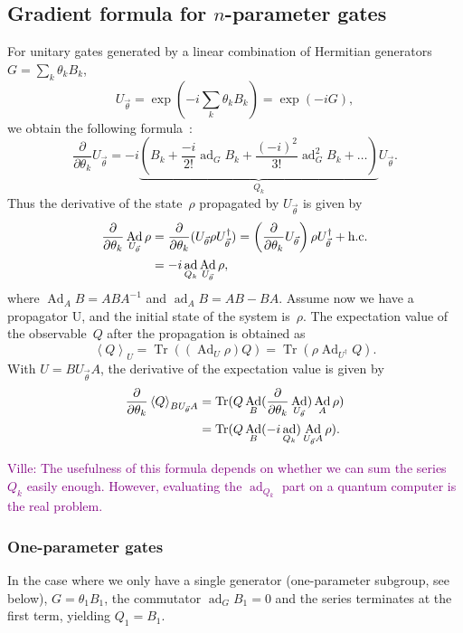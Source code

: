 \documentclass[aps,pra,10pt,twocolumn,groupedaddress,nofootinbib]{revtex4-1}
\theoremstyle{plain}
\DeclareMathOperator{\tr}{Tr}
\DeclareMathOperator{\Ad}{Ad}
\DeclareMathOperator{\ad}{ad}
\newcommand{\pd}[2]{\frac{\partial #1}{\partial #2}}  %
\newcommand{\be}{\begin{equation}}
\newcommand{\ee}{\end{equation}}
\newcommand{\expect}[1]{\ensuremath{\left\langle #1 \right\rangle}} %
\newcommand{\ville}[1]{\textcolor{purple}{Ville: #1}}
\begin{document}
\subsection{Gradient formula for $n$-parameter gates}
\label{sec:gradient_formula_for_n_parameter_gates}
For unitary gates generated by a linear combination of Hermitian generators
$G = \sum_k \theta_k B_k$,
\be
U_{\vec{\theta}} = \exp(-i \sum_k \theta_k B_k) = \exp(-i G),
\ee
we obtain the following formula~\cite{dynamo_manual}:
\be
\pd{}{\theta_k} U_{\vec{\theta}}
= -i \underbrace{\left(B_k +\frac{-i}{2!}\ad_G B_k +\frac{(-i)^2}{3!}\ad_G^2 B_k +\ldots \right)}_{Q_k}
U_{\vec{\theta}}.
\ee
Thus the derivative of the state~$\rho$ propagated by $U_{\vec{\theta}}$ is given by
\begin{align}
  \notag
  \pd{}{\theta_k} \Ad_{U_{\vec{\theta}}} \rho
  &= \pd{}{\theta_k} (U_{\vec{\theta}} \rho U_{\vec{\theta}}^\dagger)
  = \left(\pd{}{\theta_k} U_{\vec{\theta}}\right) \rho U_{\vec{\theta}}^\dagger +\text{h.c.}\\
  &= -i \ad_{Q_k} \Ad_{U_{\vec{\theta}}} \rho,
\end{align}
where $\Ad_{A} B = A B A^{-1}$ and $\ad_{A} B = A B - B A$.
Assume now we have a propagator U, and the initial state of the system is~$\rho$.
The expectation value of the observable~$Q$ after the propagation is obtained as
\be
\label{eq:Q_ev}
\expect{Q}_U = \tr((\Ad_{U}\rho) Q)
= \tr(\rho \Ad_{U^\dagger}Q).
\ee
With $U=B U_{\vec{\theta}} A$, the derivative of the expectation value is given by
\begin{align}
  \label{eq:d_ev}
  \notag
  \pd{}{\theta_k} \expect{Q}_{B U_{\vec{\theta}} A}
  &= \tr(Q \Ad_B (\pd{}{\theta_k} \Ad_{U_{\vec{\theta}}}) \Ad_A \rho)\\
  &= \tr(Q \Ad_B (-i \ad_{Q_k}) \Ad_{U_{\vec{\theta}} A} \rho).
\end{align}

\ville{The usefulness of this formula depends on whether we can sum the series~$Q_k$ easily enough.
  However, evaluating the $\ad_{Q_k}$ part on a quantum computer is the real problem.
}

\subsubsection{One-parameter gates}

In the case where we only have a single generator (one-parameter subgroup, see below),
$G = \theta_1 B_1$, the commutator $\ad_G B_1 = 0$
and the series terminates at the first term, yielding
$Q_1 = B_1$.
\end{document}
